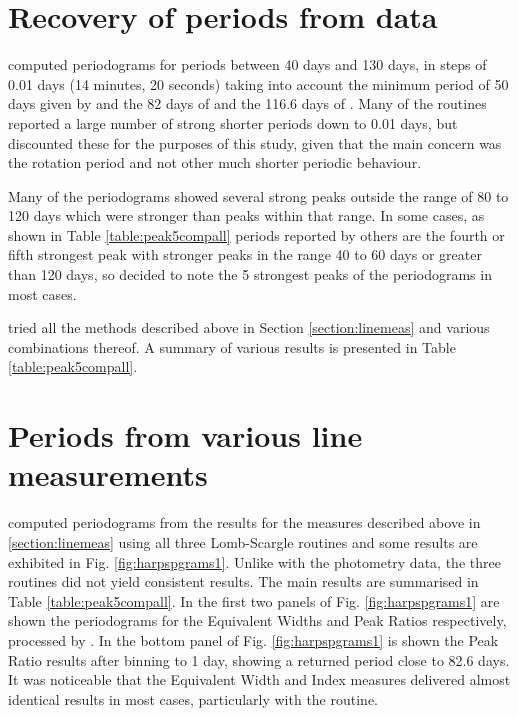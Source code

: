 \section{Recovery of periods from {\harps} data}
\protect\label{section:harps}

{\FirstP} computed periodograms for periods between 40 days and 130 days, in steps of 0.01 days (14 minutes, 20 seconds)
taking into account the minimum period of 50 days given by \citet{kurster99} and the 82 days of
\citealt{benedict92,benedict93,benedict98,kiraga07} and the 116.6 days of \citet[Table 3]{suarezmascareno15}. Many of
the routines reported a large number of strong shorter periods down to 0.01 days, but {\Firstp} discounted these for the
purposes of this study, given that the main concern was the rotation period and not other much shorter periodic
behaviour.

Many of the periodograms showed several strong peaks outside the range of 80 to 120 days which were stronger than peaks
within that range. In some cases, as shown in Table \ref{table:peak5compall} periods reported by others are the
fourth or fifth strongest peak with stronger peaks in the range 40 to 60 days or greater than 120 days, so {\Firstp}
decided to note the 5 strongest peaks of the periodograms in most cases.

{\FirstP} tried all the methods described above in Section \ref{section:linemeas} and various combinations thereof. A
summary of various results is presented in Table \ref{table:peak5compall}.

\section{Periods from various line measurements}
\protect\label{section:harpsper}

{\FirstP} computed periodograms from the results for the measures described above in \ref{section:linemeas} using all
three Lomb-Scargle routines and some results are exhibited in Fig. \ref{fig:harpspgrams1}. Unlike with the {\asas}
photometry data, the three routines did not yield consistent results. The main results are summarised in Table
\ref{table:peak5compall}. In the first two panels of Fig. \ref{fig:harpspgrams1} are shown the periodograms for the
Equivalent Widths and Peak Ratios respectively, processed by {\gatspy}. In the bottom panel of
Fig. \ref{fig:harpspgrams1} is shown the Peak Ratio results after binning to 1 day, showing a returned period close to
82.6 days. It was noticeable that the Equivalent Width and {\ha} Index measures delivered almost identical results in
most cases, particularly with the {\gatspy} routine.

